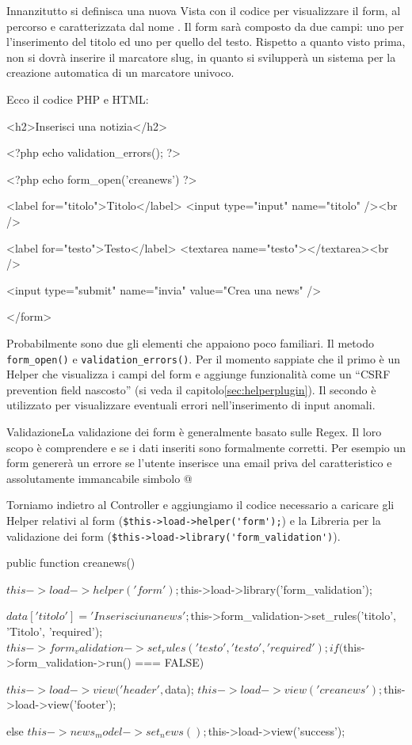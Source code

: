 Innanzitutto si definisca una nuova Vista con il codice per visualizzare il form, al percorso  e caratterizzata dal nome . Il form sarà composto da due campi: uno per l'inserimento del titolo ed uno per quello del testo. Rispetto a quanto visto prima, non si dovrà inserire il marcatore slug, in quanto si svilupperà un sistema per la creazione automatica di un marcatore univoco.

Ecco il codice \ac{PHP} e \ac{HTML}:

\begin{code}
<h2>Inserisci una notizia</h2>

<?php echo validation_errors(); ?>

<?php echo form_open('creanews') ?>

	<label for="titolo">Titolo</label>
	<input type="input" name="titolo" /><br />

	<label for="testo">Testo</label>
	<textarea name="testo"></textarea><br />

	<input type="submit" name="invia" value="Crea una news" />

</form>
\end{code}

Probabilmente sono due gli elementi che appaiono poco familiari. Il metodo \verb|form_open()| e \verb|validation_errors()|. Per il momento sappiate che il primo è un Helper che visualizza i campi del form e aggiunge funzionalità come un ``CSRF prevention field nascosto'' (si veda il capitolo\vref{sec:helperplugin}). Il secondo è utilizzato per visualizzare eventuali errori nell'inserimento di input anomali.

\begin{deftab}{Validazione}{La validazione dei form è generalmente basato sulle Regex. Il loro scopo è comprendere e se i dati inseriti sono formalmente corretti. Per esempio un form genererà un errore se l'utente inserisce una email priva del caratteristico e assolutamente immancabile simbolo @}
\end{deftab}

Torniamo indietro al Controller  e aggiungiamo il codice necessario a caricare gli Helper relativi al form (\verb|$this->load->helper('form');|) e la Libreria per la validazione dei form (\verb|$this->load->library('form_validation')|).

\begin{code}
public function creanews()
{
	$this->load->helper('form');
	$this->load->library('form_validation');

	$data['titolo'] = 'Inserisci una news';

	$this->form_validation->set_rules('titolo', 'Titolo', 'required');
	$this->form_validation->set_rules('testo', 'testo', 'required');

	if ($this->form_validation->run() === FALSE)
	{
		$this->load->view('header', $data);
		$this->load->view('creanews');
		$this->load->view('footer');

	}
	else
	{
		$this->news_model->set_news();
		$this->load->view('success');
	}
}
\end{code}

